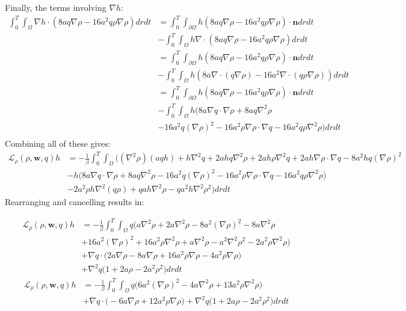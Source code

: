 \documentclass[11pt, a4paper]{article}
\theoremstyle{definition}
\newcommand{\w}{\mathbf{w}}
\newcommand{\n}{\mathbf{n}}
\begin{document}
Finally, the terms involving $\nabla h$:
\begin{align*}
\int_0^T \int_\Omega \nabla h \cdot \left( 8a q\nabla \rho - 16 a^2 q \rho \nabla \rho  \right) dr dt &= \int_0^T \int_{\partial \Omega}  h \left( 8a q \nabla \rho - 16 a^2 q\rho \nabla \rho  \right) \cdot \n dr dt \\
&- \int_0^T \int_\Omega h \nabla \cdot\left( 8a q \nabla \rho - 16 a^2 q\rho \nabla \rho  \right) dr dt\\
& = \int_0^T \int_{\partial \Omega}  h \left( 8a q\nabla \rho - 16 a^2 q \rho \nabla \rho  \right) \cdot \n dr dt \\
&- \int_0^T \int_\Omega h \left( 8a \nabla \cdot( q \nabla \rho) - 16 a^2 \nabla \cdot (q\rho \nabla \rho ) \right) dr dt\\
& = \int_0^T \int_{\partial \Omega}  h \left( 8a q\nabla \rho - 16 a^2 q \rho \nabla \rho  \right) \cdot \n dr dt \\
&- \int_0^T \int_\Omega h \bigg( 8a \nabla q \cdot \nabla \rho + 8aq \nabla^2 \rho  \\
&- 16 a^2 q (\nabla \rho)^2 - 16 a^2 \rho \nabla \rho \cdot \nabla q - 16 a^2 q \rho \nabla^2 \rho \bigg) dr dt\\
\end{align*}
Combining all of these gives:
\begin{align*}
\mathcal{L}_\rho(\rho, \w, q) h &= -\frac{1}{\beta}  \int_0^T \int_\Omega \bigg( (\nabla^2 \rho) ( aq h ) + h\nabla^2 q + 2 a h q \nabla^2 \rho + 2 a h  \rho \nabla^2 q + 2 a h \nabla \rho \cdot \nabla q
 - 8a^2 hq \left(\nabla \rho\right)^2   \\
&- h \bigg( 8a \nabla q \cdot \nabla \rho + 8aq \nabla^2 \rho  
- 16 a^2 q (\nabla \rho)^2 - 16 a^2 \rho \nabla \rho \cdot \nabla q - 16 a^2 q \rho \nabla^2 \rho \bigg)\\
& - 2a^2 \rho h \nabla^2 (q\rho)  + qah \nabla^2 \rho - qa^2 h \nabla^2 \rho^2 \bigg)  dr dt
\end{align*}
Rearranging and cancelling results in:

\begin{align*}
\mathcal{L}_\rho(\rho, \w, q) h &= -\frac{1}{\beta}  \int_0^T \int_\Omega q \bigg(a \nabla^2 \rho + 2 a   \nabla^2 \rho - 8a^2  \left(\nabla \rho\right)^2  - 8a \nabla^2 \rho\\
& + 16 a^2  (\nabla \rho)^2 + 16a^2 \rho \nabla^2 \rho + a \nabla^2 \rho - a^2  \nabla^2 \rho^2  - 2a^2 \rho  \nabla^2 \rho \bigg)\\
&+ \nabla q \cdot \bigg( 2 a  \nabla \rho -  8a  \nabla \rho  + 16 a^2 \rho \nabla \rho  - 4a^2 \rho  \nabla \rho \bigg)\\
&+ \nabla^2 q \bigg(1 + 2 a   \rho   - 2a^2 \rho^2        \bigg) dr dt
\end{align*}
\begin{align*}
\mathcal{L}_\rho(\rho, \w, q) h &= -\frac{1}{\beta}  \int_0^T \int_\Omega q \bigg( 6a^2  \left(\nabla \rho\right)^2  - 4a \nabla^2 \rho + 13a^2 \rho \nabla^2 \rho \bigg)\\
&+ \nabla q \cdot \bigg( -  6a  \nabla \rho  + 12 a^2 \rho \nabla \rho  \bigg)+ \nabla^2 q \bigg(1 + 2 a   \rho   - 2a^2 \rho^2        \bigg) dr dt
\end{align*}
\end{document}
